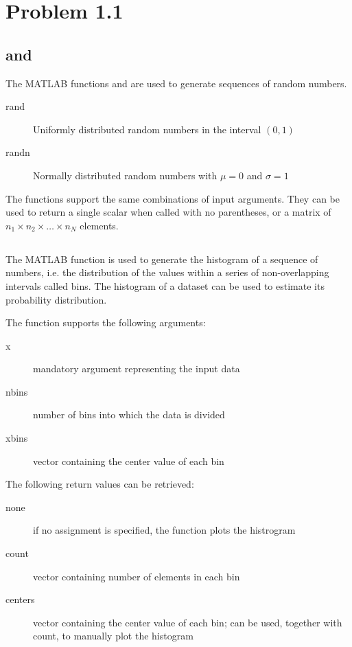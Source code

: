 \section{Problem 1.1}

\subsection{ and }
The MATLAB functions  and  are used to generate sequences of random numbers.
\begin{description}
	\item[rand] Uniformly distributed random numbers in the interval $ (0, 1) $
	\item[randn] Normally distributed random numbers with $ \mu = 0 $ and $ \sigma = 1 $
\end{description}

The functions support the same combinations of input arguments.
They can be used to return a single scalar when called with no parentheses, or a matrix of $ n_1 \times n_2 \times \dots \times n_N $ elements.


\subsection{}
The MATLAB function  is used to generate the histogram of a sequence of numbers, i.e. the distribution of the values within a series of non-overlapping intervals called bins.
The histogram of a dataset can be used to estimate its probability distribution.

The function supports the following arguments:
\begin{description}
	\item[x] mandatory argument representing the input data
	\item[nbins] number of bins into which the data is divided
	\item[xbins] vector containing the center value of each bin
\end{description}

The following return values can be retrieved:
\begin{description}
	\item[none] if no assignment is specified, the function plots the histrogram
	\item[count] vector containing number of elements in each bin
	\item[centers] vector containing the center value of each bin; can be used, together with count, to manually plot the histogram
\end{description}


